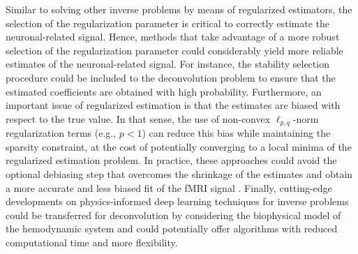 Similar to solving other inverse problems by means of regularized estimators,
the selection of the regularization parameter is critical to correctly estimate
the neuronal-related signal. Hence, methods that take advantage of a more robust
selection of the regularization parameter could considerably yield more reliable
estimates of the neuronal-related signal. For instance, the stability selection
\citep{Meinshausen2010Stabilityselection,Urunuela2020StabilityBasedSparse}
procedure could be included to the deconvolution problem to ensure that the
estimated coefficients are obtained with high probability. Furthermore, an
important issue of regularized estimation is that the estimates are biased with
respect to the true value. In that sense, the use of non-convex
\(\ell_{p,q}\)-norm regularization terms (e.g., \(p < 1\)) can reduce this bias
while maintaining the sparsity constraint, at the cost of potentially converging
to a local minima of the regularized estimation problem. In practice, these
approaches could avoid the optional debiasing step that overcomes the shrinkage
of the estimates and obtain a more accurate and less biased fit of the fMRI
signal
\citep{Gaudes2013Paradigmfreemapping,CaballeroGaudes2019deconvolutionalgorithmmulti}.
Finally, cutting-edge developments on physics-informed deep learning techniques
for inverse problems \citep{Akcakaya2021,Monga2021,Ongie2020,Cherkaoui_2020}
could be transferred for deconvolution by considering the biophysical model of
the hemodynamic system and could potentially offer algorithms with reduced
computational time and more flexibility.